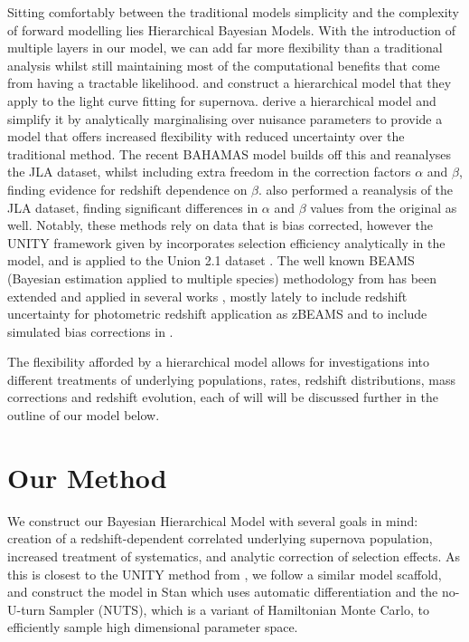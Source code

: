 \documentclass[a4paper,fleqn,usenatbib]{mnras}
\newcommand{\rubin}{\citetalias{Rubin2015}}
\begin{document}
Sitting comfortably between the traditional models simplicity and the complexity of forward modelling lies Hierarchical Bayesian Models. With the introduction of multiple layers in our model, we can add far more flexibility than a traditional analysis whilst still maintaining most of the computational benefits that come from having a tractable likelihood. \citet{Mandel2009} and \citet{Mandel2011} construct a hierarchical model that they apply to the light curve fitting for supernova. \citet{March2011, March2014, Karpenka2015} derive a hierarchical model and simplify it by analytically marginalising over nuisance parameters to provide a model that offers increased flexibility with reduced uncertainty over the traditional method. The recent BAHAMAS model \citep{Shariff2016} builds off this and reanalyses the JLA dataset, whilst including extra freedom in the correction factors $\alpha$ and $\beta$, finding evidence for redshift dependence on $\beta$. \citet{Ma2016} also performed a reanalysis of the JLA dataset, finding significant differences in $\alpha$ and $\beta$ values from the original as well. Notably, these methods rely on data that is bias corrected, however the UNITY framework given by \citet{Rubin2015} incorporates selection efficiency analytically in the model, and is applied to the Union 2.1 dataset \citep{Suzuki2012}. The well known BEAMS (Bayesian estimation applied to multiple species) methodology from \citet{Kunz2007} has been extended and applied in several works \citep{Hlozek2012}, mostly lately to include redshift uncertainty for photometric redshift application as zBEAMS \citep{Roberts2017} and to include simulated bias corrections in \citet{Kessler2017}.

The flexibility afforded by a hierarchical model allows for investigations into different treatments of underlying populations, rates, redshift distributions, mass corrections and redshift evolution, each of will will be discussed further in the outline of our model below.









\section{Our Method}
\label{sec:method}

We construct our Bayesian Hierarchical Model with several goals in mind: creation of a redshift-dependent correlated underlying supernova population, increased treatment of systematics, and analytic correction of selection effects. As this is closest to the UNITY method from \citet[][hereafter denoted \rubin]{Rubin2015}, we follow a similar model scaffold, and construct the model in Stan \citep{Carpenter2017, StanDevelopmentTeam2017} which uses automatic differentiation and the no-U-turn Sampler (NUTS), which is a variant of Hamiltonian Monte Carlo, to efficiently sample high dimensional parameter space.
\end{document}
